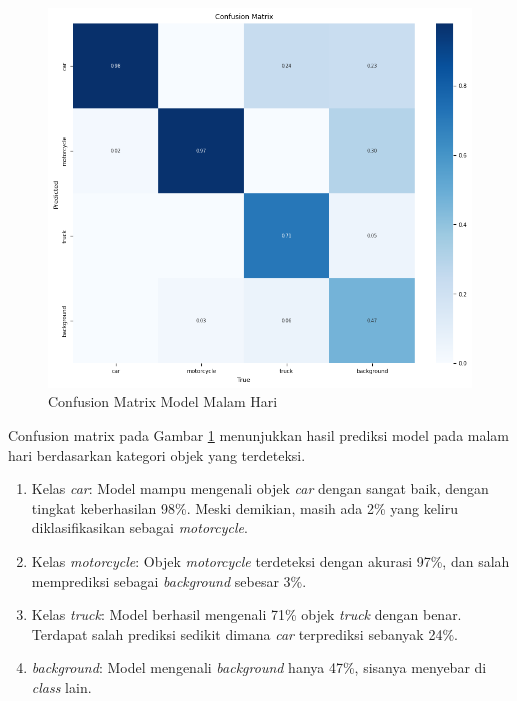 \begin{figure} [H] \centering
  \includegraphics[scale=0.8]{bab4/confusion_malam.png}
  \caption{Confusion Matrix Model Malam Hari}
  \label{fig:confusion matrix malam}
\end{figure}
\vspace{-10pt}
Confusion matrix pada Gambar \ref{fig:confusion matrix malam} menunjukkan hasil prediksi model pada malam hari berdasarkan kategori objek yang terdeteksi.

\begin{enumerate}[nosep]
\item Kelas \emph{car}:
Model mampu mengenali objek \emph{car} dengan sangat baik, dengan tingkat keberhasilan 98\%. Meski demikian, masih ada 2\% yang keliru diklasifikasikan sebagai \emph{motorcycle}.

\item Kelas \emph{motorcycle}:  
Objek \emph{motorcycle} terdeteksi dengan akurasi 97\%, dan salah memprediksi sebagai \emph{background} sebesar 3\%.

\item Kelas \emph{truck}:  
Model berhasil mengenali 71\% objek \emph{truck} dengan benar. Terdapat salah prediksi sedikit dimana \emph{car} terprediksi sebanyak 24\%.

\item \emph{background}:  
Model mengenali \emph{background} hanya 47\%, sisanya menyebar di \emph{class} lain.
\end{enumerate}

